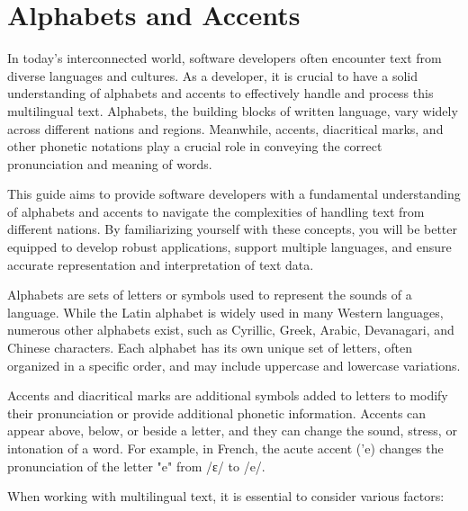 \chapter{Alphabets and Accents}

In today's interconnected world, software developers often encounter text from diverse languages and cultures. As a developer, it is crucial to have a solid understanding of alphabets and accents to effectively handle and process this multilingual text. Alphabets, the building blocks of written language, vary widely across different nations and regions. Meanwhile, accents, diacritical marks, and other phonetic notations play a crucial role in conveying the correct pronunciation and meaning of words.

This guide aims to provide software developers with a fundamental understanding of alphabets and accents to navigate the complexities of handling text from different nations. By familiarizing yourself with these concepts, you will be better equipped to develop robust applications, support multiple languages, and ensure accurate representation and interpretation of text data.

Alphabets are sets of letters or symbols used to represent the sounds of a language. While the Latin alphabet is widely used in many Western languages, numerous other alphabets exist, such as Cyrillic, Greek, Arabic, Devanagari, and Chinese characters. Each alphabet has its own unique set of letters, often organized in a specific order, and may include uppercase and lowercase variations.

Accents and diacritical marks are additional symbols added to letters to modify their pronunciation or provide additional phonetic information. Accents can appear above, below, or beside a letter, and they can change the sound, stress, or intonation of a word. For example, in French, the acute accent ('e) changes the pronunciation of the letter "e" from /ɛ/ to /e/.

When working with multilingual text, it is essential to consider various factors:

